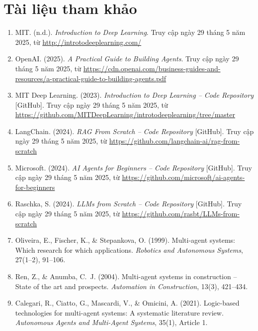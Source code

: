 \cleardoublepage
{}
{}
\chapter*{Tài liệu tham khảo}
\label{tài-liệu-tham-khảo}

\begin{enumerate}
\def\labelenumi{\arabic{enumi}.}

\item
  MIT. (n.d.). \emph{Introduction to Deep Learning}. Truy cập ngày 29 tháng 5 năm 2025, từ \url{http://introtodeeplearning.com/}

\item
  OpenAI. (2025). \emph{A Practical Guide to Building Agents}. Truy cập ngày 29 tháng 5 năm 2025, từ \url{https://cdn.openai.com/business-guides-and-resources/a-practical-guide-to-building-agents.pdf}

\item
  MIT Deep Learning. (2023). \emph{Introduction to Deep Learning -- Code Repository} [GitHub]. Truy cập ngày 29 tháng 5 năm 2025, từ \url{https://github.com/MITDeepLearning/introtodeeplearning/tree/master}

\item
  LangChain. (2024). \emph{RAG From Scratch -- Code Repository} [GitHub]. Truy cập ngày 29 tháng 5 năm 2025, từ \url{https://github.com/langchain-ai/rag-from-scratch}

\item
  Microsoft. (2024). \emph{AI Agents for Beginners -- Code Repository} [GitHub]. Truy cập ngày 29 tháng 5 năm 2025, từ \url{https://github.com/microsoft/ai-agents-for-beginners}

\item
  Raschka, S. (2024). \emph{LLMs from Scratch -- Code Repository} [GitHub]. Truy cập ngày 29 tháng 5 năm 2025, từ \url{https://github.com/rasbt/LLMs-from-scratch}

\item
  Oliveira, E., Fischer, K., \& Stepankova, O. (1999). Multi-agent systems: Which research for which applications. \emph{Robotics and Autonomous Systems}, 27(1--2), 91--106.

\item
  Ren, Z., \& Anumba, C.~J. (2004). Multi-agent systems in construction -- State of the art and prospects. \emph{Automation in Construction}, 13(3), 421--434.

\item
  Calegari, R., Ciatto, G., Mascardi, V., \& Omicini, A. (2021). Logic-based technologies for multi-agent systems: A systematic literature review. \emph{Autonomous Agents and Multi-Agent Systems}, 35(1), Article 1.


\end{enumerate}
